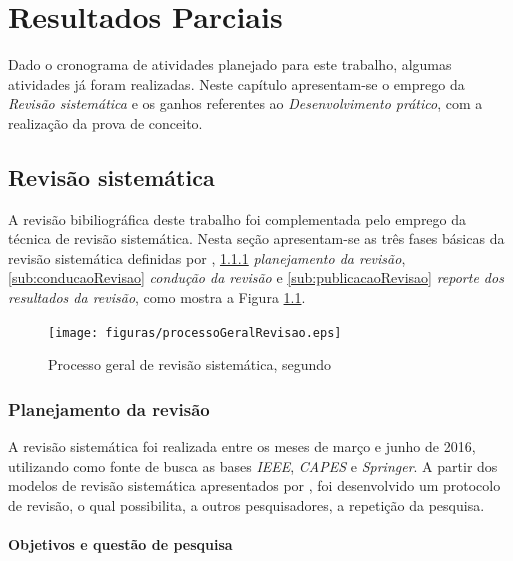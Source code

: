 \chapter[Resultados parciais]{Resultados Parciais}
\label{sec:resultados_parciais}

Dado o cronograma de atividades planejado para este trabalho, algumas atividades já foram realizadas. Neste capítulo apresentam-se o emprego da \textit{Revisão sistemática} e os ganhos referentes ao  \textit{Desenvolvimento prático}, com a realização da prova de conceito.

\section{Revisão sistemática} %
\label{sec:revisão_sistemática}

	A revisão bibiliográfica deste trabalho foi complementada pelo emprego da técnica de revisão sistemática. Nesta seção apresentam-se as três fases básicas da revisão sistemática definidas por \cite{Kitchenham}, \ref{sub:planejamentoRevisao} \textit{planejamento da revisão}, \ref{sub:conducaoRevisao} \textit{condução da revisão} e \ref{sub:publicacaoRevisao} \textit{reporte dos resultados da revisão}, como mostra a Figura \ref{img:processoGeralRevisao}.

	\begin{figure}[H]
			\centering
			\texttt{[image: figuras/processoGeralRevisao.eps]}
			\caption[Processo geral de revisão sistemática]{Processo geral de revisão sistemática, segundo \cite{Kitchenham}}
			\label{img:processoGeralRevisao}
		\end{figure}

	\subsection{Planejamento da revisão} %
	\label{sub:planejamentoRevisao}

		A revisão sistemática foi realizada entre os meses de março e junho de 2016, utilizando como fonte de busca as bases \textit{IEEE}, \textit{CAPES} e \textit{Springer}. A partir dos modelos de revisão sistemática apresentados por \cite{Kitchenham}, foi desenvolvido um protocolo de revisão, o qual possibilita, a outros pesquisadores, a repetição da pesquisa.

		\subsubsection{Objetivos e questão de pesquisa}
		
